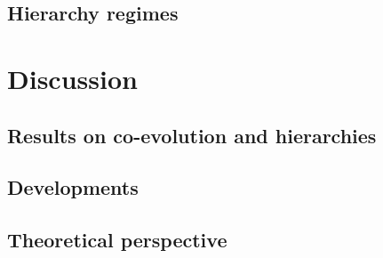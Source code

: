 \documentclass[english,fleqn,allpages]{ISTE_science}[2018/07/30]
\begin{document}
\subsection{Hierarchy regimes}









\section{Discussion}



\subsection{Results on co-evolution and hierarchies}





\subsection{Developments}



\subsection{Theoretical perspective}


\end{document}
